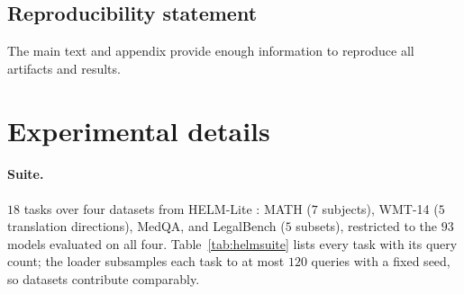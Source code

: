 \documentclass{article}
\theoremstyle{definition}
\theoremstyle{plain}
\begin{document}
\subsection*{Reproducibility statement}
The main text and appendix provide enough information to reproduce all artifacts and results.





\appendix
\section{Experimental details}
\label{app:details}

\paragraph{Suite.} $18$ tasks over four datasets from HELM-Lite \citep{helm}: MATH ($7$
subjects), WMT-14 ($5$ translation directions), MedQA, and LegalBench ($5$ subsets),
restricted to the $93$ models evaluated on all four. Table~\ref{tab:helmsuite} lists
every task with its query count; the loader subsamples each task to at most $120$
queries with a fixed seed, so datasets contribute comparably.
\end{document}
